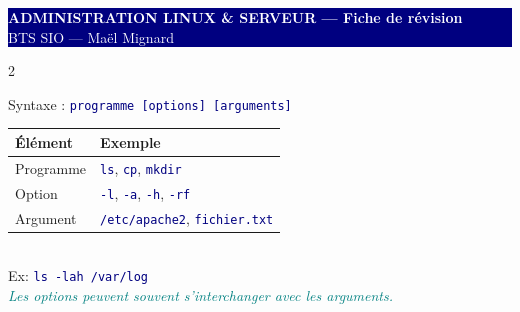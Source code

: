 \documentclass[a4paper,10pt]{article}
\newcommand{\cmd}[1]{\texttt{\textcolor{navy}{#1}}}
\newcommand{\tip}[1]{\textit{\textcolor{teal}{#1}}}
\begin{document}
\begin{center}
  \colorbox{navy}{\parbox{\dimexpr\textwidth-2\fboxsep}{
    \centering\vspace{3pt}
    {\LARGE\bfseries\textcolor{white}{ADMINISTRATION LINUX \& SERVEUR — Fiche de révision}}\\
    {\normalsize\textcolor{white}{BTS SIO — Maël Mignard}}
    \vspace{3pt}
  }}
\end{center}
\vspace{6pt}

\begin{multicols}{2}

\begin{tcolorbox}[basebox, colframe=navy, title=1. Structure d'une commande Bash]
Syntaxe : \cmd{programme [options] [arguments]} \\[4pt]
\begin{tabular}{ll}
\textbf{Élément} & \textbf{Exemple} \\
\hline
Programme & \cmd{ls}, \cmd{cp}, \cmd{mkdir} \\
Option & \cmd{-l}, \cmd{-a}, \cmd{-h}, \cmd{-rf} \\
Argument & \cmd{/etc/apache2}, \cmd{fichier.txt} \\
\end{tabular}
\vspace{4pt}\\
Ex: \cmd{ls -lah /var/log}\\
\tip{Les options peuvent souvent s'interchanger avec les arguments.}
\end{tcolorbox}


\end{multicols}
\end{document}
